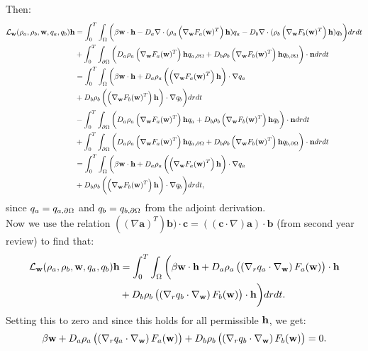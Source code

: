     Then:
	\begin{align*}
	\mathcal{L}_{\mathbf{w}}(\rho_a,\rho_b, \mathbf{w}, q_a, q_b) \mathbf{h}  &= \int_0^T \int_\Omega \bigg( \beta \mathbf{w} \cdot \mathbf{h} - D_a \nabla \cdot (\rho_a \left(\nabla_{\mathbf{w}} F_a(\mathbf{w})^T\right) \mathbf{h})  q_a - D_b \nabla \cdot (\rho_b \left(\nabla_{\mathbf{w}} F_b(\mathbf{w})^T \right)\mathbf{h}) q_b \bigg)dr dt \\
	&+ \int_0^T \int_{\partial \Omega} \bigg( D_a \rho_a \left(\nabla_{\mathbf{w}} F_a(\mathbf{w})^T\right) \mathbf{h} q_{a,\partial \Omega}   + D_b \rho_b \left(\nabla_{\mathbf{w}} F_b(\mathbf{w})^T\right) \mathbf{h}q_{b,\partial \Omega}     \bigg) \cdot \mathbf{n} dr dt\\
	&= \int_0^T \int_\Omega \bigg( \beta \mathbf{w} \cdot \mathbf{h} + D_a \rho_a \left(\left(\nabla_{\mathbf{w}} F_a(\mathbf{w})^T\right) \mathbf{h} \right)\cdot\nabla  q_a \\
	&+ D_b \rho_b \left(\left(\nabla_{\mathbf{w}} F_b(\mathbf{w})^T\right) \mathbf{h} \right)\cdot \nabla q_b  \bigg)dr dt \\
	&- \int_0^T \int_{\partial \Omega} \bigg( D_a \rho_a \left(\nabla_{\mathbf{w}} F_a(\mathbf{w})^T\right) \mathbf{h} q_a   + D_b \rho_b \left(\nabla_{\mathbf{w}} F_b(\mathbf{w})^T\right) \mathbf{h}q_b     \bigg) \cdot \mathbf{n} dr dt\\
	&+ \int_0^T \int_{\partial \Omega} \bigg( D_a \rho_a \left(\nabla_{\mathbf{w}} F_a(\mathbf{w})^T\right) \mathbf{h} q_{a,\partial \Omega}   + D_b \rho_b \left(\nabla_{\mathbf{w}} F_b(\mathbf{w})^T\right) \mathbf{h}q_{b,\partial \Omega}     \bigg) \cdot \mathbf{n} dr dt\\
	&=\int_0^T \int_\Omega \bigg( \beta \mathbf{w} \cdot \mathbf{h} + D_a \rho_a \left(\left(\nabla_{\mathbf{w}} F_a(\mathbf{w})^T\right) \mathbf{h} \right)\cdot\nabla  q_a \\
	&+ D_b \rho_b \left(\left(\nabla_{\mathbf{w}} F_b(\mathbf{w})^T\right) \mathbf{h} \right)\cdot \nabla q_b  \bigg)dr dt,
	\end{align*}
	since $q_a = q_{a,\partial \Omega}$ and $q_b = q_{b,\partial \Omega}$ from the adjoint derivation.\\
	Now we use the relation $((\nabla \mathbf a)^T)\mathbf b) \cdot \mathbf c= (( \mathbf c \cdot \nabla) \mathbf a ) \cdot \mathbf b$ (from second year review) to find that:
	\begin{align*}
	\mathcal{L}_{\mathbf{w}}(\rho_a,\rho_b, \mathbf{w}, q_a, q_b) \mathbf{h}  &= \int_0^T \int_\Omega \bigg( \beta \mathbf{w} \cdot \mathbf{h} + D_a \rho_a \left( \left(\nabla_r q_a \cdot \nabla_{\mathbf{w}} \right) F_a(\mathbf{w}) \right) \cdot \mathbf{h}         \\
	&+ D_b \rho_b \left( \left(\nabla_r q_b \cdot \nabla_{\mathbf{w}} \right) F_b(\mathbf{w}) \right) \cdot \mathbf{h}       \bigg)dr dt.
	\end{align*}
	Setting this to zero and since this holds for all permissible $\mathbf{h}$, we get:
	\begin{align*}
	\beta \mathbf{w}  + D_a \rho_a \left( \left(\nabla_r q_a \cdot \nabla_{\mathbf{w}} \right) F_a(\mathbf{w}) \right) 
	+ D_b \rho_b \left( \left(\nabla_r q_b \cdot \nabla_{\mathbf{w}} \right) F_b(\mathbf{w}) \right) = 0.
	\end{align*} 
